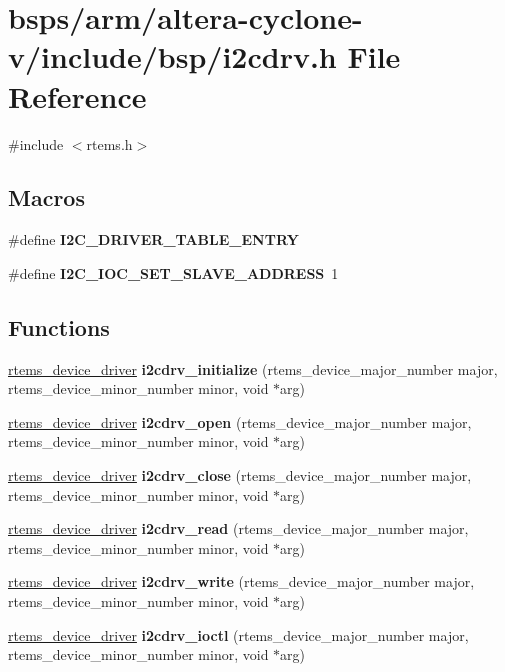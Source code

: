 \hypertarget{arm_2altera-cyclone-v_2include_2bsp_2i2cdrv_8h}{}\section{bsps/arm/altera-\/cyclone-\/v/include/bsp/i2cdrv.h File Reference}
\label{arm_2altera-cyclone-v_2include_2bsp_2i2cdrv_8h}
{\ttfamily \#include $<$rtems.\+h$>$}\newline
\subsection*{Macros}
\begin{DoxyCompactItemize}
\item 
\#define {\bfseries I2\+C\+\_\+\+D\+R\+I\+V\+E\+R\+\_\+\+T\+A\+B\+L\+E\+\_\+\+E\+N\+T\+RY}
\item 
\#define {\bfseries I2\+C\+\_\+\+I\+O\+C\+\_\+\+S\+E\+T\+\_\+\+S\+L\+A\+V\+E\+\_\+\+A\+D\+D\+R\+E\+SS}~1
\end{DoxyCompactItemize}
\subsection*{Functions}
\begin{DoxyCompactItemize}
\item 
\mbox{\hyperlink{group__ClassicStatus_ga545d41846817eaba6143d52ee4d9e9fe}{rtems\+\_\+device\+\_\+driver}} {\bfseries i2cdrv\+\_\+initialize} (rtems\+\_\+device\+\_\+major\+\_\+number major, rtems\+\_\+device\+\_\+minor\+\_\+number minor, void $\ast$arg)
\item 
\mbox{\hyperlink{group__ClassicStatus_ga545d41846817eaba6143d52ee4d9e9fe}{rtems\+\_\+device\+\_\+driver}} {\bfseries i2cdrv\+\_\+open} (rtems\+\_\+device\+\_\+major\+\_\+number major, rtems\+\_\+device\+\_\+minor\+\_\+number minor, void $\ast$arg)
\item 
\mbox{\hyperlink{group__ClassicStatus_ga545d41846817eaba6143d52ee4d9e9fe}{rtems\+\_\+device\+\_\+driver}} {\bfseries i2cdrv\+\_\+close} (rtems\+\_\+device\+\_\+major\+\_\+number major, rtems\+\_\+device\+\_\+minor\+\_\+number minor, void $\ast$arg)
\item 
\mbox{\hyperlink{group__ClassicStatus_ga545d41846817eaba6143d52ee4d9e9fe}{rtems\+\_\+device\+\_\+driver}} {\bfseries i2cdrv\+\_\+read} (rtems\+\_\+device\+\_\+major\+\_\+number major, rtems\+\_\+device\+\_\+minor\+\_\+number minor, void $\ast$arg)
\item 
\mbox{\hyperlink{group__ClassicStatus_ga545d41846817eaba6143d52ee4d9e9fe}{rtems\+\_\+device\+\_\+driver}} {\bfseries i2cdrv\+\_\+write} (rtems\+\_\+device\+\_\+major\+\_\+number major, rtems\+\_\+device\+\_\+minor\+\_\+number minor, void $\ast$arg)
\item 
\mbox{\hyperlink{group__ClassicStatus_ga545d41846817eaba6143d52ee4d9e9fe}{rtems\+\_\+device\+\_\+driver}} {\bfseries i2cdrv\+\_\+ioctl} (rtems\+\_\+device\+\_\+major\+\_\+number major, rtems\+\_\+device\+\_\+minor\+\_\+number minor, void $\ast$arg)
\end{DoxyCompactItemize}
